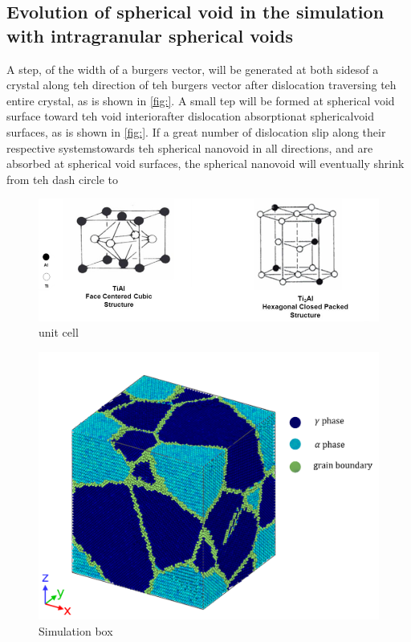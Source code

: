 \documentclass[times]{elsarticle}
\begin{document}

\subsection{Evolution of spherical void in the simulation with intragranular spherical voids}
A step, of the width of a burgers vector, will be generated at both sidesof a crystal along teh direction of teh burgers vector after dislocation traversing teh entire crystal, as is shown in \ref{fig:}. A small tep will be formed at spherical void surface toward teh void interiorafter dislocation absorptionat sphericalvoid surfaces, as is shown in \ref{fig:}. If a great number of dislocation slip along their respective systemstowards teh spherical nanovoid in all directions, and are absorbed at spherical void surfaces, the spherical nanovoid will eventually shrink from teh dash circle to

\begin{figure}
	\centering
	\includegraphics[width=0.7\linewidth]{img/cell}
	\caption{unit cell}
	\label{fig:unit_cell}
\end{figure}

\begin{figure}
	\centering
	\includegraphics[width=0.7\linewidth]{img/pf_model_labeled}
	\caption{Simulation box}
	\label{fig:simulation_box}
\end{figure}
\end{document}
